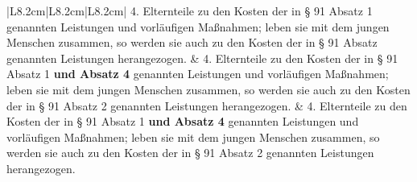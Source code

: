 \documentclass[10pt,a4paper,landscape]{article}
\begin{document}
\begin{longtable}{|L{8.2cm}|L{8.2cm}|L{8.2cm}|}
4.   \newline Elternteile zu den Kosten der in \S{} 91  \newline Absatz 1 genannten Leistungen und  \newline vorläufigen Maßnahmen; leben sie mit dem  \newline jungen Menschen zusammen, so werden  \newline sie auch zu den Kosten der in \S{} 91 Absatz   genannten Leistungen herangezogen. & 4.   \newline Elternteile zu den Kosten der in \S{} 91  \newline Absatz 1 \textbf{und Absatz 4} genannten  \newline Leistungen und vorläufigen Maßnahmen;  \newline leben sie mit dem jungen Menschen  \newline zusammen, so werden sie auch zu den  \newline Kosten der in \S{} 91 Absatz 2 genannten  \newline Leistungen herangezogen. & 4.   \newline Elternteile zu den Kosten der in \S{} 91  \newline Absatz 1 \textbf{und Absatz 4} genannten  \newline Leistungen und vorläufigen Maßnahmen;  \newline leben sie mit dem jungen Menschen  \newline zusammen, so werden sie auch zu den  \newline Kosten der in \S{} 91 Absatz 2 genannten  \newline Leistungen herangezogen. \\
\hhline{|---|}

\end{longtable}
\end{document}
